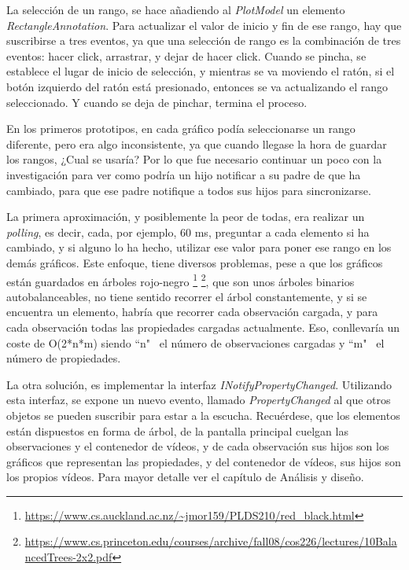 La selecci\'on de un rango, se hace a\~nadiendo al \emph{PlotModel} un elemento \emph{RectangleAnnotation}.
Para actualizar el valor de inicio y fin de ese rango, hay que suscribirse a tres eventos, ya que una selecci\'on
de rango es la combinaci\'on de tres eventos: hacer click, arrastrar, y dejar de hacer click. Cuando se pincha,
se establece el lugar de inicio de selecci\'on, y mientras se va moviendo el rat\'on, si el bot\'on izquierdo
del rat\'on est\'a presionado, entonces se va actualizando el rango seleccionado. Y cuando se deja de pinchar,
termina el proceso.

En los primeros prototipos, en cada gr\'afico pod\'ia seleccionarse un rango diferente, pero era algo inconsistente, ya
que cuando llegase la hora de guardar los rangos, ¿Cual se usar\'ia? Por lo que fue necesario continuar un poco con la 
investigaci\'on para ver como podr\'ia un hijo notificar a su padre de que ha cambiado, para que ese padre notifique a todos
sus hijos para sincronizarse.

La primera aproximaci\'on, y posiblemente la peor de todas, era realizar un \emph{polling}, es decir, cada, por ejemplo, 60 ms,
preguntar a cada elemento si ha cambiado, y si alguno lo ha hecho, utilizar ese valor para poner ese rango en los dem\'as 
gr\'aficos. Este enfoque, tiene diversos problemas, pese a que los gr\'aficos est\'an guardados en \'arboles rojo-negro
\footnote{\url{https://www.cs.auckland.ac.nz/~jmor159/PLDS210/red\_black.html}}
\footnote{\url{https://www.cs.princeton.edu/courses/archive/fall08/cos226/lectures/10BalancedTrees-2x2.pdf}}, que son
unos \'arboles binarios autobalanceables,
no tiene sentido recorrer el \'arbol constantemente, y si se encuentra un elemento, habr\'ia que recorrer cada observaci\'on cargada,
y para cada observaci\'on todas las propiedades cargadas actualmente. Eso,
conllevar\'ia un coste de O(2*n*m) siendo ``n" \ el n\'umero de observaciones cargadas y ``m" \ el n\'umero de propiedades.

La otra soluci\'on, es implementar la interfaz \emph{INotifyPropertyChanged}. Utilizando esta interfaz, se expone un 
nuevo evento, llamado \emph{PropertyChanged} al que otros objetos se pueden suscribir para estar a la escucha. Recu\'erdese,
que los elementos est\'an dispuestos en forma de \'arbol, de la pantalla principal cuelgan las observaciones y el
contenedor de v\'ideos,
y de cada observaci\'on sus hijos son los gr\'aficos que representan las propiedades, y del contenedor de v\'ideos, sus hijos
son los propios v\'ideos. Para mayor detalle ver el cap\'itulo de An\'alisis y dise\~no.

